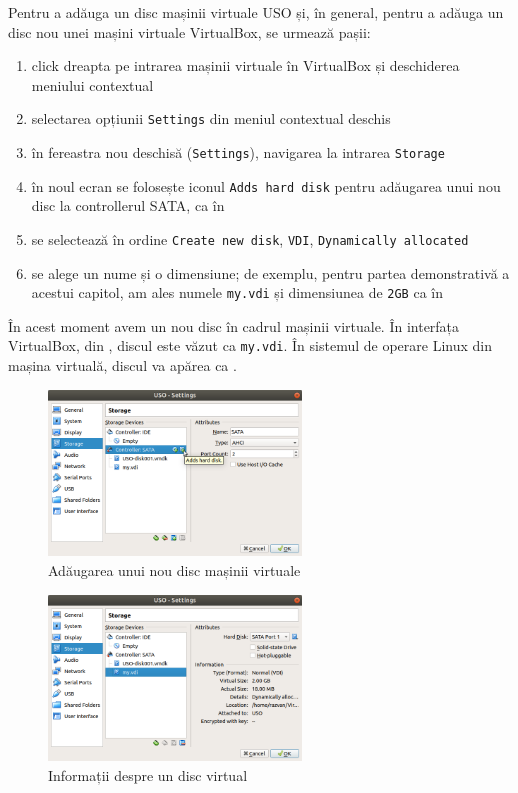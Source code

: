 Pentru a adăuga un disc mașinii virtuale USO și, în general, pentru a adăuga un disc nou unei mașini virtuale VirtualBox, se urmează pașii:
\begin{enumerate}
  \item click dreapta pe intrarea mașinii virtuale în VirtualBox și
deschiderea meniului contextual
  \item selectarea opțiunii \texttt{Settings} din meniul contextual deschis
  \item în fereastra nou deschisă (\texttt{Settings}), navigarea la intrarea \texttt{Storage}
  \item în noul ecran se folosește iconul \texttt{Adds hard disk} pentru adăugarea unui nou disc la controllerul SATA, ca în 
  \item se selectează în ordine \texttt{Create new disk}, \texttt{VDI}, \texttt{Dynamically allocated}
  \item se alege un nume și o dimensiune; de exemplu, pentru partea demonstrativă a acestui capitol, am ales numele \texttt{my.vdi} și dimensiunea de \texttt{2GB} ca în 
\end{enumerate}

În acest moment avem un nou disc în cadrul mașinii virtuale.
În interfața VirtualBox, din , discul este văzut ca \texttt{my.vdi}.
În sistemul de operare Linux din mașina virtuală, discul va apărea ca .

\begin{figure}[!htbp]
  \centering
  \includegraphics[width=0.6\textwidth]{chapters/10-storage/img/vm-new-disk.png}
  \caption{Adăugarea unui nou disc mașinii virtuale}
  \label{fig:storage:vm-new-disk}
\end{figure}

\begin{figure}[!htbp]
  \centering
  \includegraphics[width=0.6\textwidth]{chapters/10-storage/img/vm-disk-info.png}
  \caption{Informații despre un disc virtual}
  \label{fig:storage:vm-disk-info}
\end{figure}

